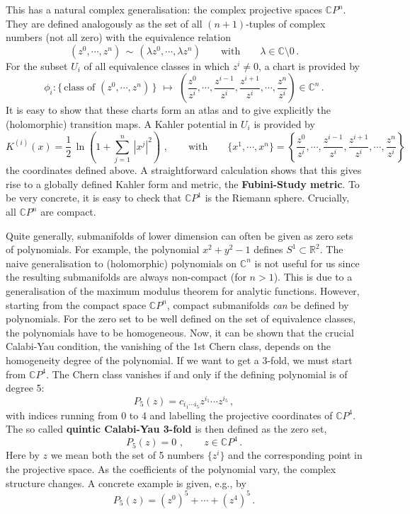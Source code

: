 \documentclass[12pt]{article}
\newcommand{\be}{\begin{equation}}
\newcommand{\ee}{\end{equation}}
\numberwithin{equation}{section}
\begin{document}
This has a natural complex generalisation: the complex projective spaces $\mathbb{C}P^n$. They are defined analogously as the set of all $(n+1)$-tuples of complex numbers (not all zero) with the equivalence relation
\be
(z^0,\cdots,z^n)\,\sim\,(\lambda z^0,\cdots,\lambda z^n)\qquad\mbox{with} \qquad \lambda\in \mathbb{C}\setminus 0\,.
\ee
For the subset $U_i$ of all equivalence classes in which $z^i\neq 0$, a chart is provided by
\be
\phi_i: \{\,\mbox{class of}\,\,(z^0,\cdots,z^n)\,\}\,\,\mapsto\,\,
\left(\frac{z^0}{z^i},\cdots,\frac{z^{i-1}}{z^i},\frac{z^{i+1}}{z^i},\cdots,
\frac{z^n}{z^i}\right)\in \mathbb{C}^n\,.
\ee
It is easy to show that these charts form an atlas and to give explicitly the (holomorphic) transition maps. A Kahler potential in $U_i$ is provided by 
\be
K^{(i)}(x)=\frac{1}{2}\,\ln\left(1+\sum_{j=1}^n\,|x^j|^2\right)\,\,, \qquad\mbox{with}\qquad \{x^1,\cdots,x^n\}=\left\{\frac{z^0}{z^i},\cdots,\frac{z^{i-1}}{z^i}, \frac{z^{i+1}}{z^i}, \cdots,\frac{z^n}{z^i}\right\}
\ee
the coordinates defined above. A straightforward calculation shows that this gives rise to a globally defined Kahler form and metric, the {\bf Fubini-Study metric}. To be very concrete, it is easy to check that $\mathbb{C}P^1$ is the Riemann sphere. Crucially, all $\mathbb{C}P^n$ are compact. 

Quite generally, submanifolds of lower dimension can often be given as zero sets of polynomials. For example, the polynomial $x^2+y^2-1$ defines $S^1\subset \mathbb{R}^2$. The naive generalisation to (holomorphic) polynomials on $\mathbb{C}^n$ is not useful for us since the resulting submanifolds are always non-compact (for $n>1$). This is due to a generalisation of the maximum modulus theorem for analytic functions. However, starting from the compact space $\mathbb{C}P^n$, compact submanifolds {\it can} be defined by polynomials. For the zero set to be well defined on the set of equivalence classes, the polynomials have to be homogeneous. Now, it can be shown that the crucial Calabi-Yau condition, the vanishing of the 1st Chern class, depends on the homogeneity degree of the polynomial. If we want to get a 3-fold, we must start from $\mathbb{C}P^4$. The Chern class vanishes if and only if the defining polynomial is of degree 5:
\be
P_5(z)=c_{i_1\cdots i_5}z^{i_1}\cdots z^{i_5}\,,
\ee
with indices running from 0 to 4 and labelling the projective coordinates of $\mathbb{C}P^4$. The so called {\bf quintic Calabi-Yau 3-fold} is then defined as the zero set,
\be
P_5(z)=0\,\,,\qquad z\in \mathbb{C}P^4\,.
\ee
Here by $z$ we mean both the set of 5 numbers $\{z^i\}$ and the corresponding point in the projective space. As the coefficients of the polynomial vary, the complex structure changes. A concrete example is given, e.g., by
\be
P_5(z)=(z^0)^5+\cdots +(z^4)^5\,.
\ee
\end{document}
